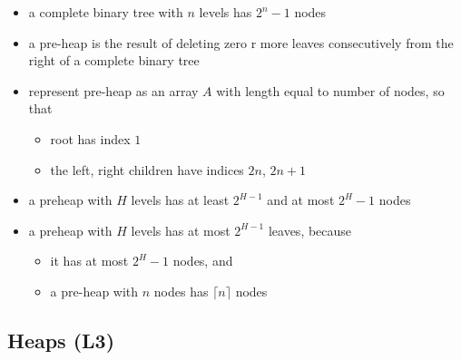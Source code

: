 \documentclass[
]{article}
\providecommand{\tightlist}{%
  \setlength{\itemsep}{0pt}\setlength{\parskip}{0pt}}
\begin{document}
\begin{itemize}
\tightlist
\item
  a complete binary tree with \(n\) levels has \(2^n - 1\) nodes
\item
  a pre-heap is the result of deleting zero r more leaves consecutively
  from the right of a complete binary tree
\item
  represent pre-heap as an array \(A\) with length equal to number of
  nodes, so that

  \begin{itemize}
  \tightlist
  \item
    root has index \(1\)
  \item
    the left, right children have indices \(2n\), \(2n+1\)
  \end{itemize}
\item
  a preheap with \(H\) levels has at least \(2^{H-1}\) and at most
  \(2^{H}-1\) nodes
\item
  a preheap with \(H\) levels has at most \(2^{H-1}\) leaves, because

  \begin{itemize}
  \tightlist
  \item
    it has at most \(2^{H}-1\) nodes, and
  \item
    a pre-heap with \(n\) nodes has \(\lceil n\rceil\) nodes
  \end{itemize}
\end{itemize}

\hypertarget{heaps-l3}{%
\subsection{Heaps (L3)}\label{heaps-l3}}
\end{document}
